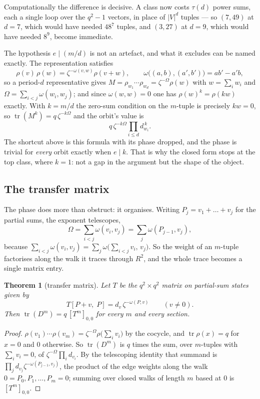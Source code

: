 \documentclass[11pt]{article}
\theoremstyle{plain}
\newtheorem{theorem}{Theorem}
\theoremstyle{definition}
\newcommand{\tr}{\operatorname{tr}}
\begin{document}
Computationally the difference is decisive. A class now costs $\tau(d)$ power
sums, each a single loop over the $q^2-1$ vectors, in place of $\lvert
V\rvert^{d}$ tuples --- so $(7,49)$ at $d=7$, which would have needed $48^{7}$
tuples, and $(3,27)$ at $d=9$, which would have needed $8^{9}$, become
immediate.

The hypothesis $e\mid(m/d)$ is not an artefact, and what it excludes can be
named exactly. The representation satisfies
\[
\rho(v)\,\rho(w)=\zeta^{-\omega(v,w)}\rho(v+w),\qquad
\omega\bigl((a,b),(a',b')\bigr)=ab'-a'b,
\]
so a period-$d$ representative gives $M=\rho_{w_1}\cdots\rho_{w_d}
=\zeta^{-\Omega}\rho(w)$ with $w=\sum_i w_i$ and
$\Omega=\sum_{i<j}\omega(w_i,w_j)$; and since $\omega(w,w)=0$ one has
$\rho(w)^{k}=\rho(kw)$ exactly. With $k=m/d$ the zero-sum condition on the
$m$-tuple is precisely $kw=0$, so $\tr(M^{k})=q\,\zeta^{-k\Omega}$ and the
orbit's value is
\[
q\,\zeta^{-k\Omega}\prod_{i\le d}d_{w_i}^{\,k}.
\]
The shortcut above is this formula with its phase dropped, and the phase is
trivial for \emph{every} orbit exactly when $e\mid k$. That is why the closed
form stops at the top class, where $k=1$: not a gap in the argument but the
shape of the object.

\subsection{The transfer matrix}\label{sec:transfer}

The phase does more than obstruct: it organises. Writing $P_j=v_1+\dots+v_j$
for the partial sums, the exponent telescopes,
\[
\Omega=\sum_{i<j}\omega(v_i,v_j)=\sum_j \omega(P_{j-1},v_j),
\]
because $\sum_{i<j}\omega(v_i,v_j)=\sum_j\omega\bigl(\sum_{i<j}v_i,\,v_j\bigr)$.
So the weight of an $m$-tuple factorises along the walk it traces through
$R^{2}$, and the whole trace becomes a single matrix entry.

\begin{theorem}[transfer matrix]\label{thm:transfer}
Let $T$ be the $q^{2}\times q^{2}$ matrix on partial-sum states given by
\[
T[P+v,\;P]=d_v\,\zeta^{-\omega(P,v)}\qquad (v\neq0).
\]
Then $\tr(D^m)=q\,[T^m]_{0,0}$ for every $m$ and every section.
\end{theorem}

\begin{proof}
$\rho(v_1)\cdots\rho(v_m)=\zeta^{-\Omega}\rho\bigl(\sum_i v_i\bigr)$ by the
cocycle, and $\tr\rho(x)=q$ for $x=0$ and $0$ otherwise. So $\tr(D^m)$ is $q$
times the sum, over $m$-tuples with $\sum_i v_i=0$, of
$\zeta^{-\Omega}\prod_i d_{v_i}$. By the telescoping identity that summand is
$\prod_j d_{v_j}\zeta^{-\omega(P_{j-1},v_j)}$, the product of the edge weights
along the walk $0=P_0,P_1,\dots,P_m=0$; summing over closed walks of length $m$
based at $0$ is $[T^m]_{0,0}$.
\end{proof}
\end{document}
